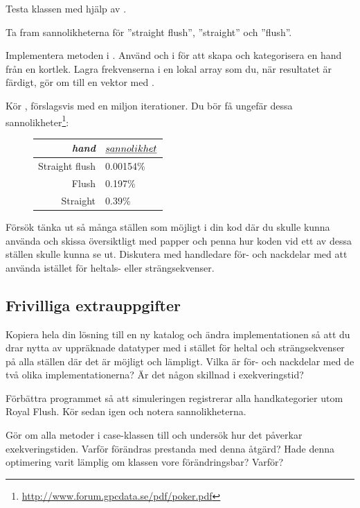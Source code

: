 \Subtask Testa klassen  med hjälp av .


\Task Ta fram sannolikheterna för ''straight flush'', ''straight'' och ''flush''.

\Subtask Implementera metoden  i . Använd  och  i  för att skapa och kategorisera en hand från en kortlek. Lagra frekvenserna i en lokal array som du, när resultatet är färdigt, gör om till en vektor med .

\Subtask Kör , förslagsvis med en miljon iterationer. Du bör få ungefär dessa sannolikheter\footnote{\url{http://www.forum.gpcdata.se/pdf/poker.pdf}}:
\begin{figure}[H]\centering
\begin{tabular}{r|l}
\emph{hand} & $\emph{sannolikhet}$ \\ \hline
Straight flush & 0.00154\%  \\
Flush          & 0.197\%    \\
Straight       & 0.39\%     \\
\end{tabular}
\end{figure}

\Task Försök tänka ut så många ställen som möjligt i din kod där du skulle kunna använda  och skissa översiktligt med papper och penna hur koden vid ett av dessa ställen skulle kunna se ut. Diskutera med handledare för- och nackdelar med att använda  istället för heltals- eller strängsekvenser. 

\subsection{Frivilliga extrauppgifter}

\Task Kopiera hela din lösning till en ny katalog och ändra implementationen så att du drar nytta av uppräknade datatyper med  i stället för heltal och strängsekvenser på alla ställen där det är möjligt och lämpligt. Vilka är för- och nackdelar med de två olika implementationerna? Är det någon skillnad i exekveringstid?

\Task Förbättra programmet så att simuleringen registrerar alla handkategorier utom Royal Flush. Kör sedan  igen och notera sannolikheterna.

\Task Gör om alla metoder i case-klassen  till  och undersök hur det påverkar exekveringstiden. Varför förändras prestanda med denna åtgärd? Hade denna optimering varit lämplig om klassen  vore förändringsbar? Varför?

